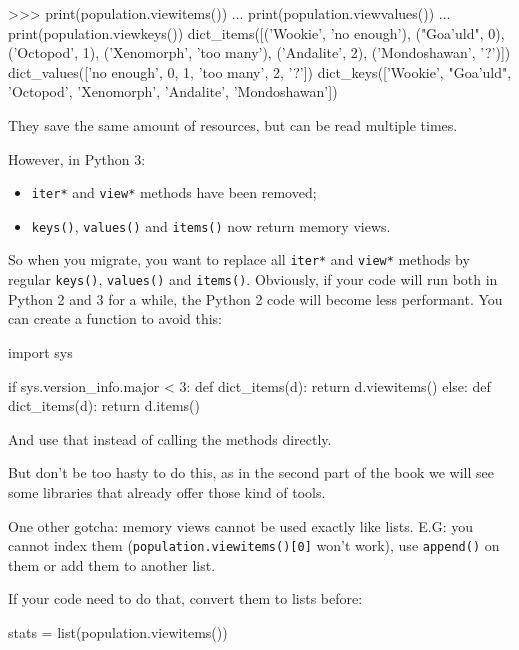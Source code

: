 \begin{py2}
>>> print(population.viewitems())
... print(population.viewvalues())
... print(population.viewkeys())
dict_items([('Wookie', 'no enough'), ("Goa'uld", 0), ('Octopod', 1), ('Xenomorph', 'too many'), ('Andalite', 2), ('Mondoshawan', '?')])
dict_values(['no enough', 0, 1, 'too many', 2, '?'])
dict_keys(['Wookie', "Goa'uld", 'Octopod', 'Xenomorph', 'Andalite', 'Mondoshawan'])
\end{py2}

They save the same amount of resources, but can be read multiple times.

However, in Python 3:

\begin{itemize}
    \item \lstinline{iter*} and \lstinline{view*} methods have been removed;
    \item \lstinline{keys()}, \lstinline{values()} and \lstinline{items()} now return memory views.
\end{itemize}

So when you migrate, you want to replace all \lstinline{iter*} and \lstinline{view*} methods by regular \lstinline{keys()}, \lstinline{values()} and \lstinline{items()}. Obviously, if your code will run both in Python 2 and 3 for a while, the Python 2 code will become less performant. You can create a function to avoid this:

\begin{py2and3}
import sys

if sys.version_info.major < 3:
    def dict_items(d):
        return d.viewitems()
else:
    def dict_items(d):
        return d.items()
\end{py2and3}

And use that instead of calling the methods directly.

But don't be too hasty to do this, as in the second part of the book we will see some libraries that already offer those kind of tools.

One other gotcha: memory views cannot be used exactly like lists. E.G: you cannot index them (\lstinline{population.viewitems()[0]} won't work), use \lstinline{append()} on them or add them to another list.

If your code need to do that, convert them to lists before:

\begin{py3}
stats = list(population.viewitems())
\end{py3}

